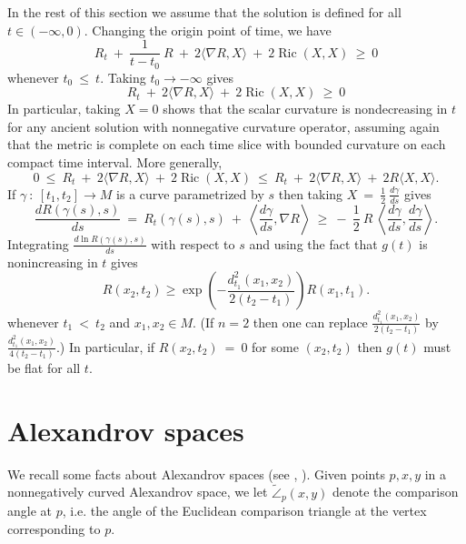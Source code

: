 \documentclass[12pt]{amsart}
\newcommand{\Ric}{\operatorname{Ric}}
\newcommand{\cangle}{\widetilde{\angle}}
\numberwithin{equation}{section}
\theoremstyle{plain}
\theoremstyle{definition}
\theoremstyle{remark}
\begin{document}
In the rest of this section we assume that
the solution is defined for all $t \in (- \infty, 0)$. 
Changing the origin point of time, we have
\begin{equation}
R_t \: + \: \frac{1}{t- t_0} \: R \: + \:
2 \langle \nabla R, X \rangle \: 
+ \: 2 \Ric(X, X) \: \ge \: 0
\end{equation} 
whenever $t_0 \: \le \: t$. Taking $t_0 \rightarrow - \infty$ gives
\begin{equation}
R_t \: + \:
2 \langle \nabla R, X \rangle \: 
+ \: 2 \Ric(X, X) \: \ge \: 0
\end{equation} 
In particular, taking $X = 0$ shows that the scalar curvature is
nondecreasing in $t$ for any ancient solution with nonnegative
curvature operator, assuming again that the metric is complete
on each time slice with bounded curvature
on each compact time interval.
More generally,
\begin{equation}
0 \: \le \: R_t \: + \: 
2 \langle \nabla R, X \rangle \: 
+ \: 2 \Ric(X, X) \: \le \: R_t \: + \: 
2 \langle \nabla R, X \rangle \: 
+ \: 2 R \langle X, X \rangle.
\end{equation} 
If $\gamma \: : \: [t_1, t_2] 
\rightarrow M$ is a curve parametrized by $s$ then taking
$X \: = \: \frac12 \: \frac{d\gamma}{ds}$ gives
\begin{equation}
\frac{d R(\gamma(s), s)}{ds}  \: = \:
R_t(\gamma(s), s) \: + \: \left\langle \frac{d\gamma}{ds}, \nabla R 
\right\rangle
\: \ge \: - \: \frac12 \: R \: \left\langle \frac{d\gamma}{ds}, \frac{d\gamma}{ds}
\right\rangle.
\end{equation}
Integrating $\frac{d \ln R(\gamma(s),s)}{ds}$ with respect to $s$ and using the fact that
$g(t)$ is nonincreasing in $t$ gives
\begin{equation}
\label{harnackinequality}
R(x_2,t_2)\geq 
\exp\left(-\frac{d_{t_1}^2(x_1,x_2)}{2(t_2-t_1)}\right)R(x_1,t_1).
\end{equation}
whenever $t_1 \: < \: t_2$ and $x_1, x_2 \in M$.
(If $n = 2$ then one can replace $\frac{d_{t_1}^2(x_1,x_2)}{2(t_2-t_1)}$ by
$\frac{d_{t_1}^2(x_1,x_2)}{4(t_2-t_1)}$.) In particular, if
$R(x_2, t_2) \: = \: 0$ for some $(x_2, t_2)$ then $g(t)$ must be flat
for all $t$.



\section{Alexandrov spaces} \label{Alexandrov}

We recall some facts about Alexandrov spaces
(see \cite[Chapter 10]{Burago-Burago-Ivanov},
\cite{Burago-Gromov-Perelman}).
Given 
points $p,x,y$ in a nonnegatively curved Alexandrov space,
we let $\cangle_p(x,y)$ denote the comparison angle at $p$,
i.e. the angle of the Euclidean
comparison triangle at the vertex corresponding to $p$. 
\end{document}
